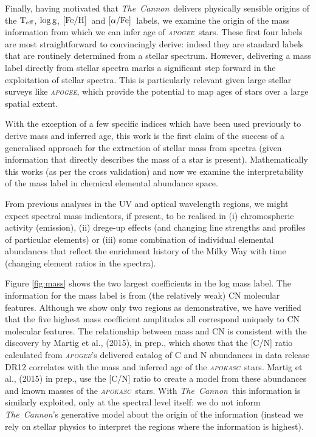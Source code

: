 \documentclass[12pt, preprint]{aastex}
\newcommand{\project}[1]{\textsl{#1}}
\newcommand{\tc}{\project{The~Cannon}}
\newcommand{\apogee}{\project{\textsc{apogee}}}
\newcommand{\apokasc}{\project{\textsc{apokasc}}}
\newcommand{\teff}{\mbox{$\rm T_{eff}$}}
\newcommand{\feh}{\mbox{$\rm [Fe/H]$}}
\newcommand{\alphafe}{\mbox{$\rm [\alpha/Fe]$}}
\newcommand{\logg}{\mbox{$\rm \log g$}}
\begin{document}
Finally, having motivated that \tc\ delivers physically sensible origins of the \teff, \logg, \feh\ and \alphafe\ labels, we examine the origin of the mass information from which we can infer age of \apogee\ stars. 
These first four labels are most straightforward  to convincingly derive: indeed they are standard labels that are routinely determined from a stellar spectrum. However, delivering a mass label directly from stellar spectra marks a significant step forward in the exploitation of stellar spectra. This is particularly relevant given large stellar surveys like \apogee, which provide the potential to map ages of stars over a large spatial extent. 

With the exception of a few specific indices which have been used previously to derive mass and inferred age, this work is the first claim of the success of a generalised approach for the extraction of stellar mass from spectra (given information that directly describes the mass of a star is present).  Mathematically this works (as per the cross validation) and now we examine the interpretability of the mass label in chemical elemental abundance space. 

From previous analyses in the UV and optical wavelength regions, we might expect spectral mass indicators, if present, to be realised in (i) chromospheric activity (emission), (ii) drege-up effects (and changing line strengths and profiles of particular elements) or (iii) some combination of individual elemental abundances that reflect the enrichment history of the Milky Way with time (changing element ratios in the spectra). 

Figure \ref{fig:mass} shows the two largest coefficients in the log mass label. The information for the mass label is from (the relatively weak) CN molecular features. Although we show only two regions as demonstrative, we have verified that the five highest mass coefficient amplitudes all correspond uniquely to CN molecular features. The relationship between mass and CN is consistent with the discovery by Martig et al., (2015), in prep., which shows that the [C/N] ratio calculated from \apogee's delivered catalog of C and N abundances in data release DR12 correlates with the mass and inferred age of the \apokasc\ stars. Martig et al., (2015) in prep., use the [C/N] ratio to create a model from these abundances and known masses of the \apokasc\ stars. With \tc\, this information is similarly exploited, only at the spectral level itself: we do not inform \tc's generative model about the origin of the information (instead we rely on stellar physics to interpret the regions where the information is highest). 
\end{document}
